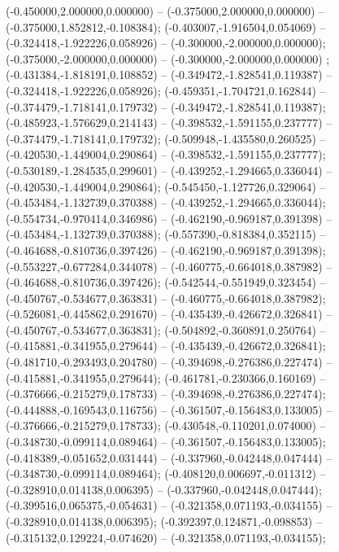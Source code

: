  (-0.450000,2.000000,0.000000) -- (-0.375000,2.000000,0.000000) -- (-0.375000,1.852812,-0.108384);
 (-0.403007,-1.916504,0.054069) -- (-0.324418,-1.922226,0.058926) -- (-0.300000,-2.000000,0.000000);
 (-0.375000,-2.000000,0.000000) -- (-0.300000,-2.000000,0.000000) ;
 (-0.431384,-1.818191,0.108852) -- (-0.349472,-1.828541,0.119387) -- (-0.324418,-1.922226,0.058926);
 (-0.459351,-1.704721,0.162844) -- (-0.374479,-1.718141,0.179732) -- (-0.349472,-1.828541,0.119387);
 (-0.485923,-1.576629,0.214143) -- (-0.398532,-1.591155,0.237777) -- (-0.374479,-1.718141,0.179732);
 (-0.509948,-1.435580,0.260525) -- (-0.420530,-1.449004,0.290864) -- (-0.398532,-1.591155,0.237777);
 (-0.530189,-1.284535,0.299601) -- (-0.439252,-1.294665,0.336044) -- (-0.420530,-1.449004,0.290864);
 (-0.545450,-1.127726,0.329064) -- (-0.453484,-1.132739,0.370388) -- (-0.439252,-1.294665,0.336044);
 (-0.554734,-0.970414,0.346986) -- (-0.462190,-0.969187,0.391398) -- (-0.453484,-1.132739,0.370388);
 (-0.557390,-0.818384,0.352115) -- (-0.464688,-0.810736,0.397426) -- (-0.462190,-0.969187,0.391398);
 (-0.553227,-0.677284,0.344078) -- (-0.460775,-0.664018,0.387982) -- (-0.464688,-0.810736,0.397426);
 (-0.542544,-0.551949,0.323454) -- (-0.450767,-0.534677,0.363831) -- (-0.460775,-0.664018,0.387982);
 (-0.526081,-0.445862,0.291670) -- (-0.435439,-0.426672,0.326841) -- (-0.450767,-0.534677,0.363831);
 (-0.504892,-0.360891,0.250764) -- (-0.415881,-0.341955,0.279644) -- (-0.435439,-0.426672,0.326841);
 (-0.481710,-0.293493,0.204780) -- (-0.394698,-0.276386,0.227474) -- (-0.415881,-0.341955,0.279644);
 (-0.461781,-0.230366,0.160169) -- (-0.376666,-0.215279,0.178733) -- (-0.394698,-0.276386,0.227474);
 (-0.444888,-0.169543,0.116756) -- (-0.361507,-0.156483,0.133005) -- (-0.376666,-0.215279,0.178733);
 (-0.430548,-0.110201,0.074000) -- (-0.348730,-0.099114,0.089464) -- (-0.361507,-0.156483,0.133005);
 (-0.418389,-0.051652,0.031444) -- (-0.337960,-0.042448,0.047444) -- (-0.348730,-0.099114,0.089464);
 (-0.408120,0.006697,-0.011312) -- (-0.328910,0.014138,0.006395) -- (-0.337960,-0.042448,0.047444);
 (-0.399516,0.065375,-0.054631) -- (-0.321358,0.071193,-0.034155) -- (-0.328910,0.014138,0.006395);
 (-0.392397,0.124871,-0.098853) -- (-0.315132,0.129224,-0.074620) -- (-0.321358,0.071193,-0.034155);
